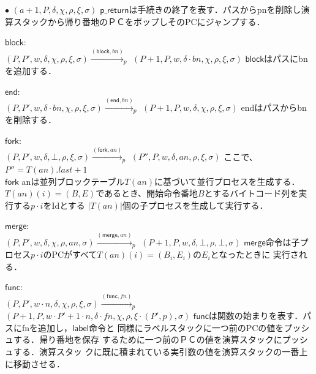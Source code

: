 \documentclass[submit,PRO]{ipsj}
\newcommand{\bcode}[1]{$\mathsf{#1}$}
\begin{document}
\begin{list}{$\bullet$}{}
\qquad $(a+1,P,\delta,\chi,\rho,\xi,\sigma)$\newline
\bcode{p\_return}は手続きの終了を表す．パスからpnを削除し演算スタックから帰り番地のＰＣをポップしそのPCにジャンプする．
\item \bcode{block}:\\
$(P,P',w,\delta,\chi,\rho,\xi,\sigma)\xrightarrow{(\mathsf{block},bn)}_p$\newline
\qquad $(P+1,P,w,\delta\cdot bn,\chi,\rho,\xi,\sigma)$\newline
\bcode{block}はパスにbnを追加する．
\item \bcode{end}:\\
$(P,P',w,\delta\cdot bn,\chi,\rho,\xi,\sigma)\xrightarrow{(\mathsf{end},bn)}_p$\newline
\qquad $(P+1,P,w,\delta,\chi,\rho,\xi,\sigma)$\newline
endはパスからbnを削除する．
\item \bcode{fork}:\\
$(P,P',w,\delta,\bot,\rho,\xi,\sigma)\xrightarrow{(\mathsf{fork},an)}_p$\newline
\qquad $(P'',P,w,\delta,an,\rho,\xi,\sigma)$\newline
ここで、$P''=T(an).last+1$\\
\bcode{fork} anは並列ブロックテーブル$T(an)$に基づいて並行プロセスを生成する．
$T(an)(i)=(B,E)$であるとき、開始命令番地$B$とするバイトコード列を実行する$p\cdot i$をIdとする
$|T(an)|$個の子プロセスを生成して実行する．
\item \bcode{merge}:\\
$(P,P',w,\delta,\chi,\rho,an,\sigma)\xrightarrow{(\mathsf{merge},an)}_p$\newline
\qquad $(P+1,P,w,\delta,\bot,\rho,\bot,\sigma)$\newline
\bcode{merge}命令は子プロセス$p\cdot i$のPCがすべて$T(an)(i)=(B_i,E_i)$の$E_i$となったときに
実行される．
\item \bcode{func}:\\
$(P,P',w\cdot n,\delta,\chi,\rho,\xi,\sigma)\xrightarrow{(\mathsf{func},fn)}_p$\newline
\qquad $(P+1,P,w\cdot P'+1\cdot n,\delta\cdot fn,\chi,\rho,\xi\cdot(P',p),\sigma)$\newline
\bcode{func}は関数の始まりを表す．パスにfnを追加し，\bcode{label}命令と
      同様にラベルスタックに一つ前のPCの値をプッシュする．帰り番地を保存
      するために一つ前のＰＣの値を演算スタックにプッシュする．演算スタッ
      クに既に積まれている実引数の値を演算スタックの一番上に移動させる．

\end{list}
\end{document}
